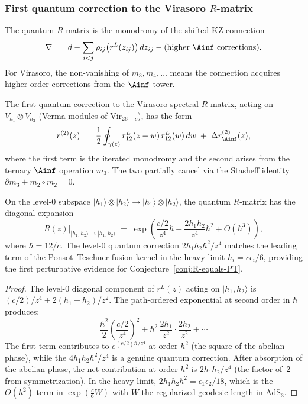\subsubsection{First quantum correction to the Virasoro $R$-matrix}
\label{subsubsec:virasoro-quantum-correction}

The quantum $R$-matrix is the monodromy of the shifted KZ connection
\[
\nabla
\;=\;
d
- \sum_{i < j}
\rho_{ij}\bigl(r^L(z_{ij})\bigr)\,dz_{ij}
- \text{(higher $\Ainf$ corrections)}.
\]
For Virasoro, the non-vanishing of $m_3, m_4, \ldots$ means the
connection acquires higher-order corrections from the $\Ainf$ tower.

\begin{proposition}
\label{prop:virasoro-first-quantum}
The first quantum correction to the Virasoro spectral $R$-matrix,
acting on $V_{h_1} \otimes V_{h_2}$ (Verma modules of
$\mathrm{Vir}_{26-c}$), has the form
\[
r^{(2)}(z)
\;=\;
\frac{1}{2}\oint_{\gamma(z)}
r^L_{12}(z-w)\,r^L_{12}(w)\,dw
\;+\;
\Delta r^{(2)}_{\Ainf}(z),
\]
where the first term is the iterated monodromy and the second arises
from the ternary $\Ainf$ operation $m_3$. The two partially cancel via
the Stasheff identity $\partial m_3 + m_2 \circ m_2 = 0$.

On the level-$0$ subspace
$|h_1\rangle \otimes |h_2\rangle \to |h_1\rangle \otimes |h_2\rangle$,
the quantum $R$-matrix has the diagonal expansion
\[
R(z)\big|_{|h_1,h_2\rangle \to |h_1,h_2\rangle}
\;=\;
\exp\!\left(
 \frac{c/2}{z^4}\hbar
 + \frac{2h_1 h_2}{z^4}\hbar^2
 + O(\hbar^3)
\right),
\]
where $\hbar = 12/c$. The level-$0$ quantum correction
$2h_1 h_2 \hbar^2/z^4$ matches the leading term of the
Ponsot--Teschner fusion kernel in the heavy limit $h_i = c\epsilon_i/6$,
providing the first perturbative evidence for
Conjecture~\textup{\ref{conj:R-equals-PT}}.
\end{proposition}

\begin{proof}
The level-$0$ diagonal component of $r^L(z)$ acting on
$|h_1,h_2\rangle$ is $(c/2)/z^4 + 2(h_1+h_2)/z^2$. The
path-ordered exponential at second order in $\hbar$ produces:
\[
\frac{\hbar^2}{2}\left(\frac{c/2}{z^4}\right)^2
+ \hbar^2\,\frac{2h_1}{z^2}\cdot\frac{2h_2}{z^2}
+ \cdots
\]
The first term contributes to $e^{(c/2)\hbar/z^4}$ at order
$\hbar^2$ (the square of the abelian phase), while the
$4h_1 h_2\hbar^2/z^4$ is a genuine quantum correction.
After absorption of the abelian phase, the net contribution at order
$\hbar^2$ is $2h_1 h_2/z^4$ (the factor of~$2$ from symmetrization).
In the heavy limit, $2h_1 h_2\hbar^2 = \epsilon_1\epsilon_2/18$,
which is the $O(\hbar^2)$ term in $\exp(\frac{c}{6}W)$ with $W$ the
regularized geodesic length in AdS$_3$.
\end{proof}

